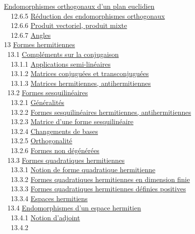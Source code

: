 \documentclass[]{article}
\begin{document}
\href{coursse72.html\#x87-39600012.6.4}{Endomorphismes orthogonaux d'un
plan euclidien} \\ ~~12.6.5
\href{coursse72.html\#x87-39700012.6.5}{Réduction des endomorphismes
orthogonaux} \\ ~~12.6.6 \href{coursse72.html\#x87-39800012.6.6}{Produit
vectoriel, produit mixte} \\ ~~12.6.7
\href{coursse72.html\#x87-39900012.6.7}{Angles} \\ 13
\href{coursch14.html\#x88-40000013}{Formes hermitiennes} \\ ~13.1
\href{coursse73.html\#x89-40100013.1}{Compléments sur la conjugaison} \\
~~13.1.1 \href{coursse73.html\#x89-40200013.1.1}{Applications
semi-linéaires} \\ ~~13.1.2
\href{coursse73.html\#x89-40300013.1.2}{Matrices conjuguées et
transconjuguées} \\ ~~13.1.3
\href{coursse73.html\#x89-40400013.1.3}{Matrices hermitiennes,
antihermitiennes} \\ ~13.2 \href{coursse74.html\#x90-40500013.2}{Formes
sesquilinéaires} \\ ~~13.2.1
\href{coursse74.html\#x90-40600013.2.1}{Généralités} \\ ~~13.2.2
\href{coursse74.html\#x90-40700013.2.2}{Formes sesquilinéaires
hermitiennes, antihermitiennes} \\ ~~13.2.3
\href{coursse74.html\#x90-40800013.2.3}{Matrice d'une forme
sesquilinéaire} \\ ~~13.2.4
\href{coursse74.html\#x90-40900013.2.4}{Changements de bases} \\
~~13.2.5 \href{coursse74.html\#x90-41000013.2.5}{Orthogonalité} \\
~~13.2.6 \href{coursse74.html\#x90-41100013.2.6}{Formes non dégénérées}
\\ ~13.3 \href{coursse75.html\#x91-41200013.3}{Formes quadratiques
hermitiennes} \\ ~~13.3.1 \href{coursse75.html\#x91-41300013.3.1}{Notion
de forme quadratique hermitienne} \\ ~~13.3.2
\href{coursse75.html\#x91-41400013.3.2}{Formes quadratiques hermitiennes
en dimension finie} \\ ~~13.3.3
\href{coursse75.html\#x91-41500013.3.3}{Formes quadratiques hermitiennes
définies positives} \\ ~~13.3.4
\href{coursse75.html\#x91-41600013.3.4}{Espaces hermitiens} \\ ~13.4
\href{coursse76.html\#x92-41700013.4}{Endomorphismes d'un espace
hermitien} \\ ~~13.4.1 \href{coursse76.html\#x92-41800013.4.1}{Notion
d'adjoint} \\ ~~13.4.2
\end{document}
